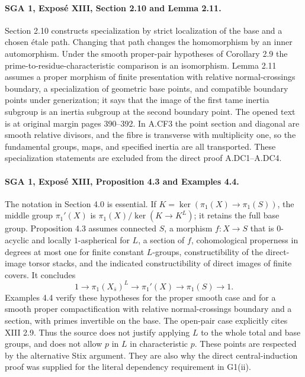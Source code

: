 \paragraph{SGA 1, Expos\'e XIII, Section 2.10 and Lemma 2.11.}
Section 2.10 constructs specialization by strict localization of the
base and a chosen \'etale path. Changing that path changes the
homomorphism by an inner automorphism. Under the smooth proper-pair
hypotheses of Corollary 2.9 the prime-to-residue-characteristic
comparison is an isomorphism. Lemma 2.11 assumes a proper morphism of
finite presentation with relative normal-crossings boundary, a
specialization of geometric base points, and compatible boundary
points under generization; it says that the image of the first tame
inertia subgroup is an inertia subgroup at the second boundary point.
The opened text is at original margin pages 390--392. In A.CF3 the
point section and diagonal are smooth relative divisors, and the fibre
is transverse with multiplicity one, so the fundamental groups, maps,
and specified inertia are all transported. These specialization
statements are excluded from the direct proof A.DC1--A.DC4.

\paragraph{SGA 1, Expos\'e XIII, Proposition 4.3 and Examples 4.4.}
The notation in Section 4.0 is essential. If
$K=\ker(\pi_1(X)\to\pi_1(S))$, the middle group $\pi_1'(X)$ is
$\pi_1(X)/\ker(K\to K^L)$; it retains the full base group.
Proposition 4.3 assumes connected $S$, a morphism $f:X\to S$ that
is $0$-acyclic and locally $1$-aspherical for $L$, a section of $f$,
cohomological properness in degrees at most one for finite constant
$L$-groups, constructibility of the direct-image torsor stacks, and
the indicated constructibility of direct images of finite covers.
It concludes
\[
 1\to\pi_1(X_{\bar s})^L\to\pi_1'(X)
 \to\pi_1(S)\to1.
\]
Examples 4.4 verify these hypotheses for the proper smooth case and
for a smooth proper compactification with relative normal-crossings
boundary and a section, with primes invertible on the base. The
open-pair case explicitly cites XIII 2.9. Thus the source does not
justify applying $L$ to the whole total and base groups, and does
not allow $p$ in $L$ in characteristic $p$. These points are respected
by the alternative Stix argument. They are also why the direct
central-induction proof was supplied for the literal dependency
requirement in G1(ii).

